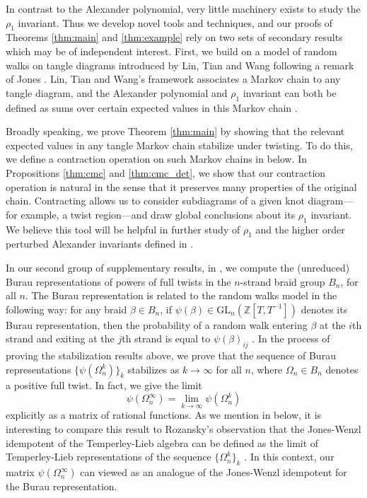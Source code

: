 \documentclass[11pt,hyp,]{nyjm}
\newcommand{\Z}{\mathbb{Z}}
\numberwithin{thm}{section}
\theoremstyle{definition}
\theoremstyle{remark}
\begin{document}
	In contrast to the Alexander polynomial, very little machinery exists to study the $\rho_1$ invariant. Thus we develop novel tools and techniques, and our proofs of Theorems \ref{thm:main} and \ref{thm:example} rely on two sets of secondary results which may be of independent interest. First, we build on a model of random walks on tangle diagrams introduced by Lin, Tian and Wang \cite{ltw98} following a remark of Jones \cite{jon87}. Lin, Tian and Wang's framework associates a Markov chain to any tangle diagram, and the Alexander polynomial and $\rho_1$ invariant can both be defined as sums over certain expected values in this Markov chain \cite{lw01, bnvdv22}.
	
	Broadly speaking, we prove Theorem \ref{thm:main} by showing that the relevant expected values in any tangle Markov chain stabilize under twisting. To do this, we define a contraction operation on such Markov chains in  below. In Propositions \ref{thm:cmc} and \ref{thm:cmc_det}, we show that our contraction operation is natural in the sense that it preserves many properties of the original chain. Contracting allows us to consider subdiagrams of a given knot diagram---for example, a twist region---and draw global conclusions about its $\rho_1$ invariant. We believe this tool will be helpful in further study of $\rho_1$ and the higher order perturbed Alexander invariants defined in \cite{bnvdv21}.
	
	In our second group of supplementary results, in , we compute the (unreduced) Burau representations of powers of full twists in the $n$-strand braid group $B_n$, for all $n$. The Burau representation is related to the random walks model in the following way: for any braid $\beta \in B_n$, if $\psi(\beta) \in \text{GL}_n(\Z[T, T^{-1}])$ denotes its Burau representation, then the probability of a random walk entering $\beta$ at the $i$th strand and exiting at the $j$th strand is equal to $\psi(\beta)_{ij}$ \cite{ltw98}. In the process of proving the stabilization results above, we prove that the sequence of Burau representations $\{\psi(\Omega_n^k)\}_k$ stabilizes as $k \to \infty$ for all $n$, where $\Omega_n \in B_n$ denotes a positive full twist. In fact, we give the limit
	$$
	\psi(\Omega_n^\infty) = \lim_{k \to \infty} \psi(\Omega_n^k)
	$$
	explicitly as a matrix of rational functions. As we mention in  below, it is interesting to compare this result to Rozansky's observation that the Jones-Wenzl idempotent of the Temperley-Lieb algebra can be defined as the limit of Temperley-Lieb representations of the sequence $\{\Omega^k_n\}_k$ \cite{roz14}. In this context, our matrix $\psi(\Omega_n^\infty)$ can viewed as an analogue of the Jones-Wenzl idempotent for the Burau representation.
	
\end{document}
